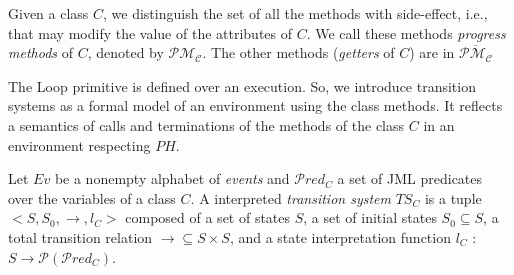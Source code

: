 \begin{definition}
  Given a class $C$, we distinguish the set of all the methods with
  side-effect, i.e., that may modify the value of the attributes of $C$. We
  call these methods \emph{progress methods} of $C$, denoted by
  $\mathcal{PM_C}$. The other methods (\emph{getters} of $C$) are in
  $\overline{\mathcal{PM_C}}$
 
\end{definition}









The \textsf{Loop} primitive is defined over an execution.  So, we introduce
transition systems as a formal model of an environment using the class
methods. It reflects a semantics of calls and terminations
of the methods of the class $C$ in an environment respecting $PH$. %

\begin{definition}\label{def-TS}   
Let $Ev$ be a nonempty alphabet of
\emph{events} and \(\mathcal{P}red_C\) a set of JML predicates
over the variables of a class $C$.
A interpreted \emph{transition system} $TS_C$ is a tuple
$<S,S_0,\rightarrow,l_C>$ composed of 
a set of states \(S\), 
a set of initial states $S_0\subseteq S$, 
a total transition relation $\rightarrow{} 
\subseteq S \times S$, 
and a state interpretation function $l_C$ : $S \rightarrow
\mathcal{P}(\mathcal{P}red_C)$. 
\end{definition}

